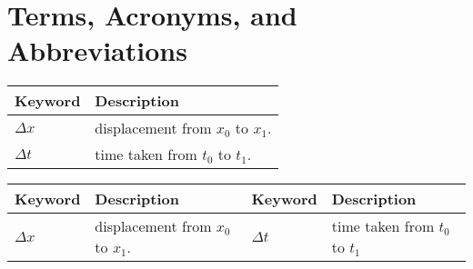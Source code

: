 \chapter*{Terms, Acronyms, and Abbreviations}

\begin{tabular}{@{}>{\raggedright\arraybackslash}p{2cm} p{}@{}}
	\textbf{Keyword} & \textbf{Description} \\
	\hline
	$\Delta x$  & displacement from $x_0$ to $x_1$. \\
	$\Delta t$  & time taken from $t_0$ to $t_1$. \\
	\hline
\end{tabular}

\vspace{1cm}

\begin{tabular}{|p{2cm} p{} | p{2cm} p{}|}
	\hline
	\textbf{Keyword} & \textbf{Description} & \textbf{Keyword} & \textbf{Description} \\
	\hline
	$\Delta x$  & displacement from $x_0$ to $x_1$. & $\Delta t$  & time taken from $t_0$ to $t_1$ \\
	\hline
\end{tabular}

\clearpage
